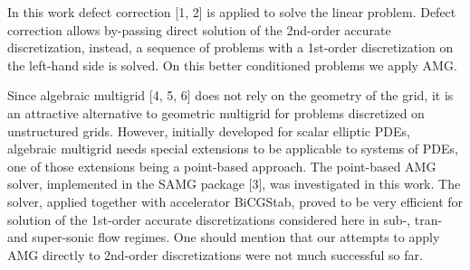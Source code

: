 \documentclass{report}
\begin{document}
In this work defect correction [1, 2] is applied to solve the linear problem.
Defect correction allows by-passing direct solution of the 2nd-order
accurate discretization,
instead, a sequence of problems with a 1st-order discretization on the left-hand side
is solved. On this better conditioned problems we apply AMG.

Since algebraic multigrid [4, 5, 6] does not rely on the geometry of the grid,
it is an attractive alternative to geometric multigrid for problems
discretized on unstructured grids.
However, initially developed for scalar elliptic PDEs, algebraic
multigrid needs special extensions
to be applicable to systems of PDEs, one of those extensions being a
point-based approach.
The point-based AMG solver, implemented in the SAMG package [3], was investigated
in this work. The solver, applied together with accelerator BiCGStab,
proved to be very efficient for
solution of the 1st-order accurate discretizations considered here in
sub-, tran- and super-sonic flow
regimes. One should mention that our attempts to apply AMG directly to
2nd-order discretizations were
not much successful so far.
\end{document}
